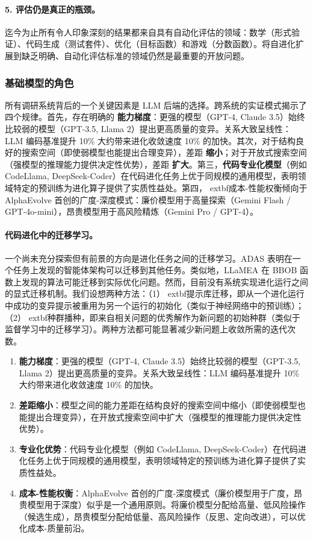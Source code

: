 \paragraph{5. 评估仍是真正的瓶颈。}
迄今为止所有令人印象深刻的结果都来自具有自动化评估的领域：数学（形式验证）、代码生成（测试套件）、优化（目标函数）和游戏（分数函数）。将自进化扩展到缺乏明确、自动化评估标准的领域仍然是最重要的开放问题。


\subsubsection{基础模型的角色}

所有调研系统背后的一个关键因素是 LLM 后端的选择。跨系统的实证模式揭示了四个规律。首先，存在明确的 \textbf{能力梯度}：更强的模型（GPT-4, Claude 3.5）始终比较弱的模型（GPT-3.5, Llama 2）提出更高质量的变异。关系大致呈线性：LLM 编码基准提升 10\% 大约带来进化收敛速度 10\% 的加快。其次，对于结构良好的搜索空间（即使弱模型也能提出合理变异），差距 \textbf{缩小}；对于开放式搜索空间（强模型的推理能力提供决定性优势），差距 \textbf{扩大}。第三，\textbf{代码专业化模型}（例如 CodeLlama, DeepSeek-Coder）在代码进化任务上优于同规模的通用模型，表明领域特定的预训练为进化算子提供了实质性益处。第四，	extbf{成本-性能权衡}倾向于 AlphaEvolve 首创的广度-深度模式：廉价模型用于高量探索（Gemini Flash / GPT-4o-mini），昂贵模型用于高风险精炼（Gemini Pro / GPT-4）。

\paragraph{代码进化中的迁移学习。}
一个尚未充分探索但有前景的方向是进化任务之间的迁移学习。ADAS 表明在一个任务上发现的智能体架构可以迁移到其他任务。类似地，LLaMEA 在 BBOB 函数上发现的算法可能迁移到实际优化问题。然而，目前没有系统实现进化运行之间的显式迁移机制。我们设想两种方法：（1）	extbf{提示库迁移}，即从一个进化运行中成功的变异提示被重用为另一个运行的初始化（类似于神经网络中的预训练）；（2）	extbf{种群播种}，即来自相关问题的优秀解作为新问题的初始种群（类似于监督学习中的迁移学习）。两种方法都可能显著减少新问题上收敛所需的迭代次数。

\begin{enumerate}
    \item \textbf{能力梯度}：更强的模型（GPT-4, Claude 3.5）始终比较弱的模型（GPT-3.5, Llama 2）提出更高质量的变异。关系大致呈线性：LLM 编码基准提升 10\% 大约带来进化收敛速度 10\% 的加快。

    \item \textbf{差距缩小}：模型之间的能力差距在结构良好的搜索空间中缩小（即使弱模型也能提出合理变异），在开放式搜索空间中扩大（强模型的推理能力提供决定性优势）。

    \item \textbf{专业化优势}：代码专业化模型（例如 CodeLlama, DeepSeek-Coder）在代码进化任务上优于同规模的通用模型，表明领域特定的预训练为进化算子提供了实质性益处。

    \item \textbf{成本-性能权衡}：AlphaEvolve 首创的广度-深度模式（廉价模型用于广度，昂贵模型用于深度）似乎是一个通用原则。将廉价模型分配给高量、低风险操作（候选生成），昂贵模型分配给低量、高风险操作（反思、定向改进），可以优化成本-质量前沿。
\end{enumerate}


